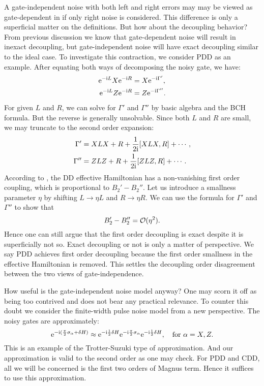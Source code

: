 \documentclass[b5paper,11pt]{article}
\begin{document}
A gate-independent noise with both left and right errors may may be viewed as gate-dependent in if only right noise is considered. This difference is only a superficial matter on the definitions. But how about the decoupling behavior? 
From previous discussion we know that gate-dependent noise will result in inexact decoupling, but gate-independent noise will have exact decoupling similar to the ideal case. To investigate this contraction, we consider PDD as an example. After equating both ways of decomposing the noisy gate, we have:
\begin{equation}
 \begin{split}
  \mathrm{e}^{-\mathrm{i} L} X \mathrm{e}^{-\mathrm{i} R} &=  X \mathrm{e}^{-\mathrm{i} \Gamma'},\\
  \mathrm{e}^{-\mathrm{i} L} Z\mathrm{e}^{-\mathrm{i} R} &=  Z \mathrm{e}^{-\mathrm{i} \Gamma''}.
 \end{split}
\end{equation}
For given $L$ and $R$, we can solve for $\Gamma'$ and $\Gamma''$ by basic algebra and the BCH formula. But the reverse is generally unsolvable. Since both $L$ and $R$ are small, we may truncate to the second order expansion:
\begin{equation}
 \begin{aligned}
  \Gamma' &= XLX +R + \frac{1}{2\mathrm{i}} [XLX, R ] + \cdots, \\
   \Gamma'' &= ZLZ +R + \frac{1}{2\mathrm{i}} [ZLZ, R ] + \cdots. 
 \end{aligned}
\end{equation}
According to , the DD effective Hamiltonian has a non-vanishing  first order  coupling, which is proportional to $B_2'-B_2''$. 
Let us introduce a smallness parameter $\eta$ by shifting $L\to \eta L$ and $R\to \eta R$. We can use the formula for $\Gamma'$ and $\Gamma''$ to show that 
\begin{equation}
 B_2'-B_2''=\mathcal{O}(\eta^2).
\end{equation}
Hence one can still argue that the first order decoupling is exact despite it is superficially not so. Exact decoupling or not is only a matter of perspective. We say PDD achieves first order decoupling because the first order smallness in the effective Hamiltonian is removed. This settles the decoupling order disagreement between the two views of gate-independence. 

How useful is the gate-independent noise model anyway? One may scorn it off as being too contrived and does not bear any practical relevance. To counter this doubt we consider the finite-width pulse noise model from a new perspective. The noisy gates are approximately:
\begin{equation}
 \mathrm{e}^{-\mathrm{i} (\frac{\pi}{2}\sigma_\alpha + \delta H)} \approx \mathrm{e}^{-\mathrm{i}  \frac{1}{2}\delta H} \mathrm{e}^{-\mathrm{i} \frac{\pi}{2}\sigma_\alpha} \mathrm{e}^{-\mathrm{i}  \frac{1}{2}\delta H}, \quad\text{for }\alpha=X,Z.
\end{equation}
This is an example of the Trotter-Suzuki type of approximation. And 
our approximation is valid to the second order as one may check. For PDD and CDD, all we will be concerned is the first two orders of Magnus term. Hence it suffices to use this approximation.
\end{document}
